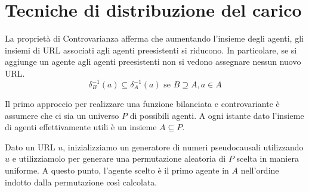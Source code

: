 \documentclass[\main/main.tex]{subfiles}
\begin{document}
\chapter{Tecniche di distribuzione del carico}
\begin{multicols}{2}
\begin{property}
    La proprietà di Controvarianza afferma che aumentando l'insieme degli agenti, gli insiemi di URL associati agli agenti preesistenti si riducono. In particolare, se si aggiunge un agente agli agenti preesistenti non si vedono assegnare nessun nuovo URL.
    \[
        \delta_{B}^{-1}(a) \subseteq \delta_{A}^{-1}(a) \text { se } B \supseteq A, a \in A
    \]
\end{property}
\begin{definition}
    Il primo approccio per realizzare una funzione bilanciata e controvariante è assumere che ci sia un universo \(P\) di possibili agenti. A ogni istante dato l'insieme di agenti effettivamente utili è un insieme \(A \subseteq P\).
    
    Dato un URL \(u\), inizializziamo un generatore di numeri pseudocausali utilizzando \(u\) e utilizziamolo per generare una permutazione aleatoria di \(P\) scelta in maniera uniforme. A questo punto, l'agente scelto è il primo agente in \(A\) nell'ordine indotto dalla permutazione così calcolata.
    

\end{definition}
\end{multicols}
\end{document}
